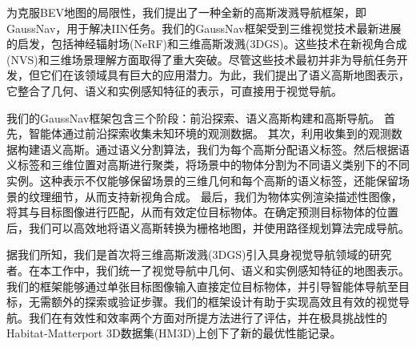 为克服BEV地图的局限性，我们提出了一种全新的高斯泼溅导航框架，即GaussNav，用于解决IIN任务。我们的GaussNav框架受到三维视觉技术最新进展的启发，包括神经辐射场(NeRF)\cite{mildenhall2020nerf}和三维高斯泼溅(3DGS)\cite{kerbl3Dgaussians}。这些技术在新视角合成(NVS)和三维场景理解方面取得了重大突破。尽管这些技术最初并非为导航任务开发，但它们在该领域具有巨大的应用潜力。为此，我们提出了语义高斯地图表示，它整合了几何、语义和实例感知特征的表示，可直接用于视觉导航。

我们的GaussNav框架包含三个阶段：前沿探索、语义高斯构建和高斯导航。
首先，智能体通过前沿探索收集未知环境的观测数据。
其次，利用收集到的观测数据构建语义高斯。通过语义分割算法\cite{he2017mask, wang2023internimage}，我们为每个高斯分配语义标签。然后根据语义标签和三维位置对高斯进行聚类，将场景中的物体分割为不同语义类别下的不同实例。这种表示不仅能够保留场景的三维几何和每个高斯的语义标签，还能保留场景的纹理细节，从而支持新视角合成。
最后，我们为物体实例渲染描述性图像，将其与目标图像进行匹配，从而有效定位目标物体。在确定预测目标物体的位置后，我们可以高效地将语义高斯转换为栅格地图，并使用路径规划算法完成导航。

据我们所知，我们是首次将三维高斯泼溅(3DGS)\cite{kerbl3Dgaussians}引入具身视觉导航领域的研究者。在本工作中，我们统一了视觉导航中几何、语义和实例感知特征的地图表示。我们的框架能够通过单张目标图像输入直接定位目标物体，并引导智能体导航至目标，无需额外的探索或验证步骤\cite{lei2024instanceaware}。我们的框架设计有助于实现高效且有效的视觉导航。我们在有效性和效率两个方面对所提方法进行了评估，并在极具挑战性的Habitat-Matterport 3D数据集(HM3D)\cite{yadav2023habitat}上创下了新的最优性能记录。